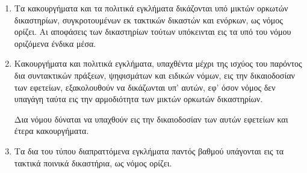\documentclass[twoside, a4paper, 10pt]{article}
\begin{document}
\begin{multicols}{2}
\begin{enumerate}
\begin{BigQuote}
\begin{enumerate}
  \item[1.] Τα κακουργήματα και τα πολιτικά εγκλήματα δικάζονται υπό μικτών ορκωτών δικαστηρίων, συγκροτουμένων εκ τακτικών δικαστών και ενόρκων, ως νόμος ορίζει. Αι αποφάσεις των δικαστηρίων τούτων υπόκεινται εις τα υπό του νόμου οριζόμενα ένδικα μέσα.
  \item[2.] Κακουργήματα και πολιτικά εγκλήματα, υπαχθέντα μέχρι της ισχύος του παρόντος δια συντακτικών πράξεων, ψηφισμάτων και ειδικών νόμων, εις την δικαιοδοσίαν των εφετείων, εξακολουθούν να δικάζωνται υπ' αυτών, εφ' όσον νόμος δεν υπαγάγη ταύτα εις την αρμοδιότητα των μικτών ορκωτών δικαστηρίων.
  
	Δια νόμου δύναται να υπαχθούν εις την δικαιοδοσίαν των αυτών εφετείων και έτερα κακουργήματα.
  \item[3.] Τα δια του τύπου διαπραττόμενα εγκλήματα παντός βαθμού υπάγονται εις τα τακτικά ποινικά δικαστήρια, ως νόμος ορίζει.
\end{enumerate}


\end{BigQuote}
\end{enumerate}
\end{multicols}
\end{document}
